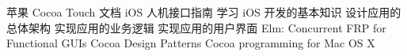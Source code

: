 \assignReq
{苹果 Cocoa Touch 文档}
{iOS 人机接口指南}
{}
{}
{}
\assignWork
{学习 iOS 开发的基本知识}
{设计应用的总体架构}
{实现应用的业务逻辑}
{实现应用的用户界面}
{}
{}
\assignRef
{Elm: Concurrent FRP for Functional GUIs}
{Cocoa Design Patterns}
{Cocoa programming for Mac OS X}
{}
{}
{}
{}
{}

